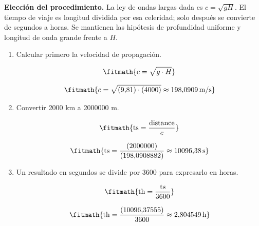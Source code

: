 \noindent\textbf{Elección del procedimiento.} La ley de ondas largas dada es $c=\sqrt{gH}$. El tiempo de viaje es longitud dividida por esa celeridad; solo después se convierte de segundos a horas. Se mantienen las hipótesis de profundidad uniforme y longitud de onda grande frente a $H$.

\begin{enumerate}

\item Calcular primero la velocidad de propagación.

\[\fitmath{c=\sqrt{g\cdot H}}\]

\[\fitmath{c=\sqrt{(9{,}81)\cdot (4000)}\approx 198{,}0909\,\mathrm{m/s}}\]

\item Convertir 2000 km a 2000000 m.

\[\fitmath{\mathrm{ts}=\frac{\mathrm{distance}}{c}}\]

\[\fitmath{\mathrm{ts}=\frac{(2000000)}{(198{,}0908882)}\approx 10096{,}38\,\mathrm{s}}\]

\item Un resultado en segundos se divide por 3600 para expresarlo en horas.

\[\fitmath{\mathrm{th}=\frac{\mathrm{ts}}{3600}}\]

\[\fitmath{\mathrm{th}=\frac{(10096{,}37555)}{3600}\approx 2{,}804549\,\mathrm{h}}\]

\end{enumerate}

